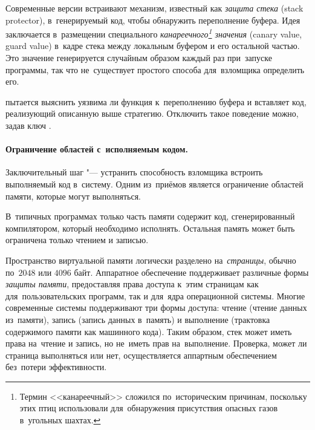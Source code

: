 Современные версии \GCC{} встраивают механизм, известный как \emph{защита стека} (\textenglish{stack protector}), в~генерируемый код, чтобы обнаружить переполнение буфера. Идея заключается в~размещении специального \emph{канареечного\footnote
{
  Термин <<канареечный>> сложился по~историческим причинам, поскольку этих птиц использовали для~обнаружения присутствия опасных газов в~угольных шахтах.
}
значения} (\textenglish{canary value, guard value}) в~кадре стека между локальным буфером и его остальной частью. Это значение генерируется случайным образом каждый раз при~запуске программы, так что не~существует простого способа для~взломщика определить его.

\GCC{} пытается выяснить уязвима ли функция к~переполнению буфера и вставляет код, реализующий описанную выше стратегию. Отключить такое поведение можно, задав ключ .



\paragraph{Ограничение областей с~исполняемым кодом.}
Заключительный шаг "--- устранить способность взломщика встроить выполняемый код в~систему. Одним из~приёмов является ограничение областей памяти, которые могут выполняться.

В~типичных программах только часть памяти содержит код, сгенерированный компилятором, который необходимо исполнять. Остальная память может быть ограничена только чтением и записью.

Пространство виртуальной памяти логически разделено на~\emph{страницы}, обычно по~\(2048\) или \(4096\) байт. Аппаратное обеспечение поддерживает различные формы \emph{защиты памяти}, предоставляя права доступа к~этим страницам как для~пользовательских программ, так и для~ядра операционной системы. Многие современные системы поддерживают три формы доступа: чтение (чтение данных из~памяти), запись (запись данных в~память) и выполнение (трактовка содержимого памяти как машинного кода). Таким образом, стек может иметь права на~чтение и запись, но не~иметь прав на~выполнение. Проверка, может ли страница выполняться или нет, осуществляется аппартным обеспечением без~потери эффективности.



\WhatToReadSection
\citeauthor[глава~3, стр.~264--271, 273--276, 279--284, \(^*\)284--295]{Bryant:2022:ru}


